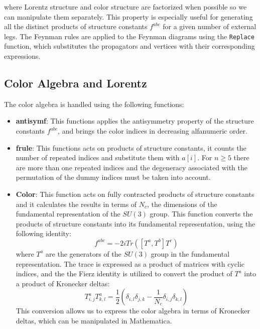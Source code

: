 \documentclass[main.tex]{subfiles}
\begin{document}
where Lorentz structure and color structure are factorized when possible so we can manipulate them separately.
This property is especially useful for generating all the distinct products of structure constants \( f^{abc} \) for a given number of external legs. 
The Feynman rules are applied to the Feynman diagrams using the \texttt{Replace} function, which substitutes the propagators and vertices with their corresponding expressions.

\subsection{Color Algebra and Lorentz}

The color algebra is handled using the following functions:

\begin{itemize}
    \item \textbf{antisymf}: This functions applies the antisymmetry property of the structure constants $f^{abc}$, 
    and brings the color indices in decreasing alfanumeric order.
    \item \textbf{frule}: This functions acts on products of structure constants, it counts the number of repeated indices and 
    substitute them with $a[i]$. For $n \ge 5$ there are more than one repeated indices and the degeneracy associated with the permutation
    of the dummy indices must be taken into account.
    \item \textbf{Color}: This function acts on fully contracted products of structure constants and it calculates the results in terms
    of $N_c$, the dimensions of the fundamental representation of the $SU(3)$ group. This function converts the products
    of structure constants into its fundamental representation, using the following identity:
    \begin{equation}
        f^{abc} = -2 i Tr \left( [T^a ,T^b] T^c \right)
    \end{equation}
    where $T^a$ are the generators of the $SU(3)$ group in the fundamental representation.
    The trace is expressed as a product of matrices with cyclic indices, and the the Fierz identity is utilized to convert the product of 
    $T^a$ into a product of Kronecker deltas:
    \begin{equation}
        T^a_{i,j} T^a_{k,l} = \frac{1}{2} \left( \delta_{i, l} \delta_{j, k} - \frac{1}{N_c} \delta_{i, j} \delta_{k, l} \right)
    \end{equation} 
    This conversion allows us to express the color algebra in terms of Kronecker deltas, which can be manipulated in Mathematica.
    

\end{itemize}
\end{document}
